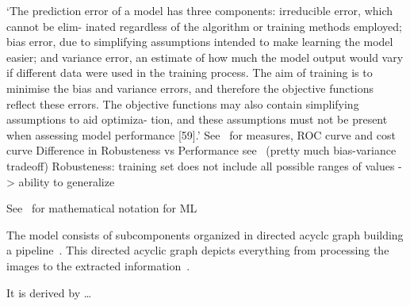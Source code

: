
`The prediction error of a model has three components: irreducible error, which cannot be elim-
inated regardless of the algorithm or training methods employed; bias error, due to simplifying
assumptions intended to make learning the model easier; and variance error, an estimate of how
much the model output would vary if different data were used in the training process. The aim
of training is to minimise the bias and variance errors, and therefore the objective functions
reflect these errors. The objective functions may also contain simplifying assumptions to aid
optimiza- tion, and these assumptions must not be present when assessing model
performance [59].'\citep{ashmore_assuring_2021}
See~\citep{ashmore_assuring_2021} for measures, ROC curve and cost curve
Difference in Robusteness vs Performance see~\citep{ashmore_assuring_2021} (pretty much
bias-variance tradeoff)
Robusteness: training set does not include all possible ranges of values -> ability to generalize

See~\citep{seshia_formal_2018} for mathematical notation for ML


The model consists of subcomponents organized in directed acyclc graph building a
pipeline~\citep{siebert_construction_2021}.
This directed acyclic graph depicts everything from processing the images to the extracted
information~\citep{siebert_construction_2021}.



It is derived by \ldots %



